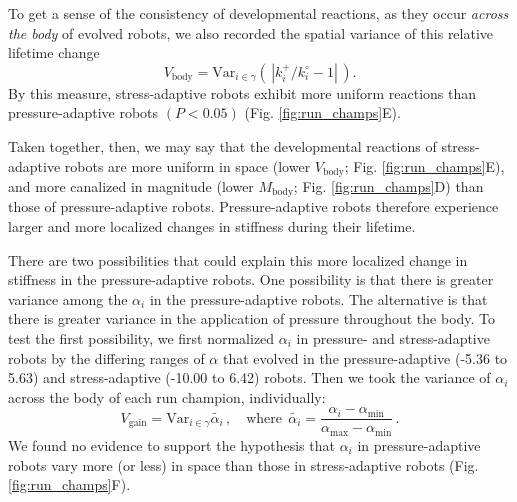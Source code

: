 To get a sense of the consistency of developmental reactions, as they occur \textit{across the body} of evolved robots, we also recorded the spatial variance of this relative lifetime change 
\begin{equation}
\label{eq:sigma}
V_{\text{body}} = \text{Var}_{i \in \gamma} \left(\,\left| k_i^{+}/k_i^{\circ}-1 \right|\,\right) .
\end{equation}
By this measure, stress-adaptive robots exhibit more uniform reactions than pressure-adaptive robots $(P<0.05)$ (Fig. \ref{fig:run_champs}E).

Taken together, then, we may say that the developmental reactions of stress-adaptive robots are more uniform in space 
(lower $V_{\text{body}}$; Fig. \ref{fig:run_champs}E), 
and more canalized in magnitude (lower $M_{\text{body}}$; 
Fig. \ref{fig:run_champs}D) than those of pressure-adaptive robots.
Pressure-adaptive robots therefore experience larger and more localized changes in stiffness during their lifetime.

There are two possibilities that could explain this more localized change in stiffness in the pressure-adaptive robots.
One possibility is that there is greater variance among the $\alpha_i$ in the pressure-adaptive robots.
The alternative is that there is greater variance in the application of pressure throughout the body.
To test the first possibility, we first normalized $\alpha_i$ in pressure- and stress-adaptive robots
by the differing ranges of $\alpha$ that evolved in the pressure-adaptive (-5.36 to 5.63) 
and stress-adaptive (-10.00 to 6.42) robots.
Then we took the variance of $\alpha_i$ across the body of each run champion, individually:
\begin{equation}
\label{eq:sigma-gain}
V_{\text{gain}} = \text{Var}_{i \in \gamma} \tilde{\alpha_i} \,, \quad \text{where} \;\, \tilde{\alpha_i}=\frac{\alpha_i-\alpha_{\text{min}}}{\alpha_{\text{max}}-\alpha_{\text{min}}}  \,.
\end{equation}
We found no evidence to support the hypothesis that $\alpha_i$ in pressure-adaptive robots vary more (or less) in space than those in stress-adaptive robots (Fig. \ref{fig:run_champs}F).


